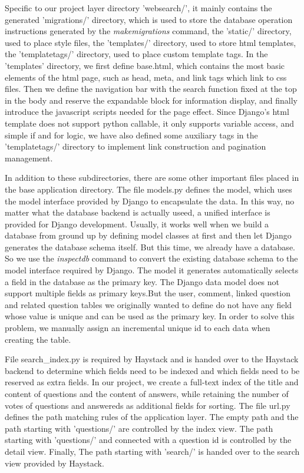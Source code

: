 \documentclass[10pt,journal,compsoc]{IEEEtran}
\begin{document}
Specific to our project layer directory 'websearch/', it mainly contains the generated 'migrations/' directory, which is used to store the database operation instructions generated by the \emph{makemigrations} command, the 'static/' directory, used to place style files, the 'templates/' directory, used to store html templates, the 'templatetags/' directory, used to place custom template tags. In the 'templates' directory, we first define base.html, which contains the most basic elements of the html page, such as head, meta, and link tags which link to css files. Then we define the navigation bar with the search function fixed at the top in the body and reserve the expandable block for information display, and finally introduce the javascript scripts needed for the page effect. Since Django's html template does not support python callable, it only supports variable access, and simple if and for logic, we have also defined some auxiliary tags in the 'templatetags/' directory to implement link construction and pagination management.

In addition to these subdirectories, there are some other important files placed in the base application directory. The file models.py defines the model, which uses the model interface provided by Django to encapsulate the data. In this way, no matter what the database backend is actually useed, a unified interface is provided for Django development. Usually, it works well when we build a database from ground up by defining model classes at first and then let Django generates the database schema itself. But this time, we already have a database. So we use the \emph{inspectdb} command to convert the existing database schema to the model interface required by Django. The model it generates automatically selects a field in the database as the primary key. The Django data model does not support multiple fields as primary keys.But the user, comment, linked question and related question tables we originally wanted to define do not have any field whose value is unique and can be used as the primary key. In order to solve this problem, we manually assign an incremental unique id to each data when creating the table.

File search\_index.py is required by Haystack and is handed over to the Haystack backend to determine which fields need to be indexed and which fields need to be reserved as extra fields. In our project, we create a full-text index of the title and content of questions and the content of answers, while retaining the number of votes of questions and answereds as additional fields for sorting. The file url.py defines the path matching rules of the application layer. The empty path and the path starting with 'questions/' are controlled by the index view. The path starting with 'questions/' and connected with a question id is controlled by the detail view. Finally, The path starting with 'search/' is handed over to the search view provided by Haystack.
\end{document}
